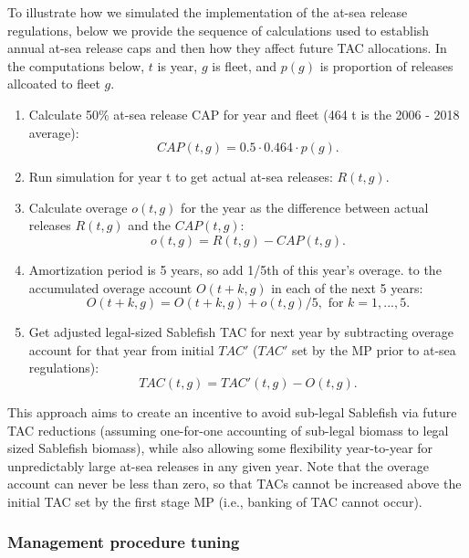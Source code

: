 \documentclass[11pt]{book}
\begin{document}
To illustrate how we simulated the implementation of the at-sea release regulations, below we provide the sequence of calculations used to establish annual at-sea release caps and then how they affect future TAC allocations. In the computations below, \(t\) is year, \(g\) is fleet, and \(p(g)\) is proportion of releases allcoated to fleet \(g\).
\begin{enumerate}
\def\labelenumi{\arabic{enumi}.}

\item
  Calculate 50\% at-sea release CAP for year and fleet (464 t is the 2006 - 2018 average): \begin{equation*}
        CAP(t,g) = 0.5 \cdot 0.464 \cdot p(g).
  \end{equation*}
\item
  Run simulation for year t to get actual at-sea releases: \(R(t,g)\).
\item
  Calculate overage \(o(t,g)\) for the year as the difference between actual releases \(R(t,g)\) and the \(CAP(t,g)\): \tabularnewline \begin{equation*}
        o(t,g) = R(t,g) - CAP(t,g).
  \end{equation*}
\item
  Amortization period is 5 years, so add 1/5th of this year's overage. to the accumulated overage account \(O(t+k,g)\) in each of the next 5 years: \begin{equation*}
        O(t + k,g) = O(t+k,g) + o(t,g)/5, \mbox{ for } k = 1, ..., 5.
  \end{equation*}
\item
  Get adjusted legal-sized Sablefish TAC for next year by subtracting overage account for that year from initial \(TAC'\) (\(TAC'\) set by the MP prior to at-sea regulations): \begin{equation*}
        TAC(t,g) = TAC'(t,g) - O(t,g).
  \end{equation*}
\end{enumerate}
This approach aims to create an incentive to avoid sub-legal Sablefish via future TAC reductions (assuming one-for-one accounting of sub-legal biomass to legal sized Sablefish biomass), while also allowing some flexibility year-to-year for unpredictably large at-sea releases in any given year. Note that the overage account can never be less than zero, so that TACs cannot be increased above the initial TAC set by the first stage MP (i.e., banking of TAC cannot occur).

\hypertarget{management-procedure-tuning}{%
\subsubsection{Management procedure tuning}\label{management-procedure-tuning}}
\end{document}
